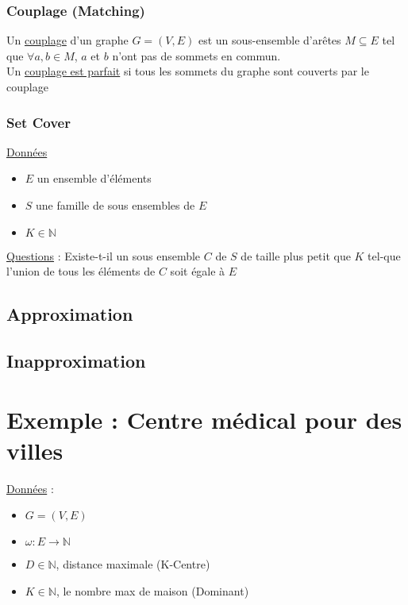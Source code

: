 \documentclass{article}
\begin{document}
      \subsubsection{Couplage (Matching)}

          Un \underline{couplage} d'un graphe $G = (V, E)$ est un sous-ensemble d'arêtes $M
          \subseteq E$ tel que $\forall a, b \in M$, $a$ et $b$ n'ont pas de
          sommets en commun.\\
          Un \underline{couplage est parfait} si tous les sommets du graphe
          sont couverts par le couplage

      \subsubsection{Set Cover}
 
        \underline{Données}
          \begin{itemize}
            \item $E$ un ensemble d'éléments
            \item $S$ une famille de sous ensembles de $E$
            \item $K \in \mathbb{N}$
          \end{itemize}

          \underline{Questions} : Existe-t-il un sous ensemble $C$ de $S$
                                  de taille plus petit que $K$ tel-que l'union
                                  de tous les éléments de $C$ soit égale à $E$

    \subsection{Approximation}

    \subsection{Inapproximation}

  \section{Exemple : Centre médical pour des villes}

    \underline{Données} :

      \begin{itemize}
        \item $G = (V, E)$
        \item $\omega : E \to \mathbb{N}$
        \item $D \in \mathbb{N}$, distance maximale (K-Centre)
        \item $K \in \mathbb{N}$, le nombre max de maison (Dominant)
      \end{itemize}
\end{document}
